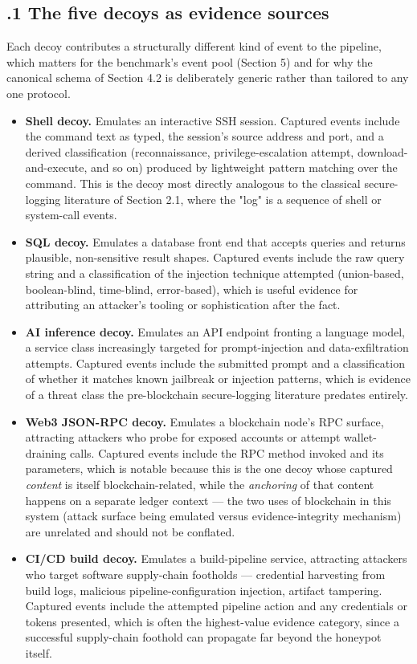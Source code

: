 \documentclass[journal]{IEEEtran}
\begin{document}
\subsection{.1 The five decoys as evidence sources}

Each decoy contributes a structurally different kind of event to the pipeline, which matters for the benchmark's event pool (Section 5) and for why the canonical schema of Section 4.2 is deliberately generic rather than tailored to any one protocol.

\begin{itemize}
\item \textbf{Shell decoy.} Emulates an interactive SSH session. Captured events include the command text as typed, the session's source address and port, and a derived classification (reconnaissance, privilege-escalation attempt, download-and-execute, and so on) produced by lightweight pattern matching over the command. This is the decoy most directly analogous to the classical secure-logging literature of Section 2.1, where the "log" is a sequence of shell or system-call events.
\item \textbf{SQL decoy.} Emulates a database front end that accepts queries and returns plausible, non-sensitive result shapes. Captured events include the raw query string and a classification of the injection technique attempted (union-based, boolean-blind, time-blind, error-based), which is useful evidence for attributing an attacker's tooling or sophistication after the fact.
\item \textbf{AI inference decoy.} Emulates an API endpoint fronting a language model, a service class increasingly targeted for prompt-injection and data-exfiltration attempts. Captured events include the submitted prompt and a classification of whether it matches known jailbreak or injection patterns, which is evidence of a threat class the pre-blockchain secure-logging literature predates entirely.
\item \textbf{Web3 JSON-RPC decoy.} Emulates a blockchain node's RPC surface, attracting attackers who probe for exposed accounts or attempt wallet-draining calls. Captured events include the RPC method invoked and its parameters, which is notable because this is the one decoy whose captured \emph{content} is itself blockchain-related, while the \emph{anchoring} of that content happens on a separate ledger context --- the two uses of blockchain in this system (attack surface being emulated versus evidence-integrity mechanism) are unrelated and should not be conflated.
\item \textbf{CI/CD build decoy.} Emulates a build-pipeline service, attracting attackers who target software supply-chain footholds --- credential harvesting from build logs, malicious pipeline-configuration injection, artifact tampering. Captured events include the attempted pipeline action and any credentials or tokens presented, which is often the highest-value evidence category, since a successful supply-chain foothold can propagate far beyond the honeypot itself.
\end{itemize}
\end{document}
